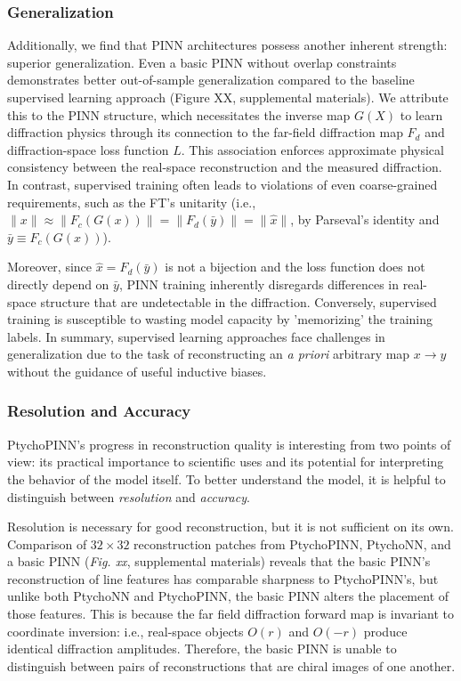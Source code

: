 \documentclass[sn-mathphys]{sn-jnl}%
\theoremstyle{thmstyleone}%
\theoremstyle{thmstyletwo}%
\theoremstyle{thmstylethree}%
\begin{document}
\subsubsection{Generalization}
Additionally, we find that PINN architectures possess another inherent strength: superior generalization. Even a basic PINN without overlap constraints demonstrates better out-of-sample generalization compared to the baseline supervised learning approach (Figure XX, supplemental materials). We attribute this to the PINN structure, which necessitates the inverse map $G(X)$ to learn diffraction physics through its connection to the far-field diffraction map $F_d$ and diffraction-space loss function $L$. This association enforces approximate physical consistency between the real-space reconstruction and the measured diffraction. In contrast, supervised training often leads to violations of even coarse-grained requirements, such as the FT's unitarity (i.e., $\lVert x \rVert \approx \lVert F_c(G(x)) \rVert = \lVert F_d(\bar{y}) \rVert = \lVert \hat{x} \rVert$, by Parseval's identity and $\bar{y} \equiv F_c(G(x))$).

Moreover, since $\hat{x} = F_d(\bar{y})$ is not a bijection and the loss function does not directly depend on $\bar{y}$, PINN training inherently disregards differences in real-space structure that are undetectable in the diffraction. Conversely, supervised training is susceptible to wasting model capacity by 'memorizing' the training labels. In summary, supervised learning approaches face challenges in generalization due to the task of reconstructing an \emph{a priori} arbitrary map $x \rightarrow \hat{y}$ without the guidance of useful inductive biases.

\subsubsection{Resolution and Accuracy}
PtychoPINN's progress in reconstruction quality is interesting from two points of view: its practical importance to scientific uses and its potential for interpreting the behavior of the model itself. To better understand the model, it is helpful to distinguish between \emph{resolution} and \emph{accuracy}.

Resolution is necessary for good reconstruction, but it is not sufficient on its own. Comparison of $32 \times 32$ reconstruction patches from PtychoPINN, PtychoNN, and a basic PINN (\emph{Fig. xx}, supplemental materials) reveals that the basic PINN's reconstruction of line features has comparable sharpness to PtychoPINN's, but unlike both PtychoNN and PtychoPINN, the basic PINN alters the placement of those features. This is because the far field diffraction forward map is invariant to coordinate inversion: i.e., real-space objects $O(r)$ and $O(-r)$ produce identical diffraction amplitudes. Therefore, the basic PINN is unable to distinguish between pairs of reconstructions that are chiral images of one another.
\end{document}
